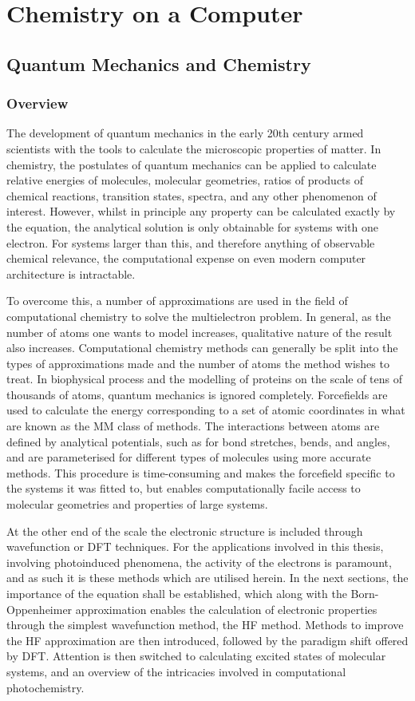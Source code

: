 \chapter{Chemistry on a Computer}
\label{chapter:theory}
\section{Quantum Mechanics and Chemistry}\label{section: QM}
\subsection{Overview}\label{section: QM_overview}
The development of quantum mechanics in the early 20th century armed scientists with the tools to calculate the microscopic properties of matter. In chemistry, the postulates of quantum mechanics can be applied to calculate relative energies of molecules, molecular geometries, ratios of products of chemical reactions, transition states, spectra, and any other phenomenon of interest. However, whilst in principle any property can be calculated exactly by the \schro{} equation, the analytical solution is only obtainable for systems with one electron. For systems larger than this, and therefore anything of observable chemical relevance, the computational expense on even modern computer architecture is intractable. 

To overcome this, a number of approximations are used in the field of computational chemistry to solve the multielectron problem. In general, as the number of atoms one wants to model increases, qualitative nature of the result also increases. Computational chemistry methods can generally be split into the types of approximations made and the number of atoms the method wishes to treat. In biophysical process and the modelling of proteins on the scale of tens of thousands of atoms, quantum mechanics is ignored completely. Forcefields are used to calculate the energy corresponding to a set of atomic coordinates in what are known as the \ac{MM} class of methods. The interactions between atoms are defined by analytical potentials, such as for bond stretches, bends, and angles, and are parameterised for different types of molecules using more accurate methods. This procedure is time-consuming and makes the forcefield specific to the systems it was fitted to, but enables computationally facile access to molecular geometries and properties of large systems.

At the other end of the scale the electronic structure is included through wavefunction or \ac{DFT} techniques. For the applications involved in this thesis, involving photoinduced phenomena, the activity of the electrons is paramount, and as such it is these methods which are utilised herein. In the next sections, the importance of the \schro{} equation shall be established, which along with the Born-Oppenheimer approximation enables the calculation of electronic properties through the simplest wavefunction method, the \ac{HF} method. Methods to improve the \ac{HF} approximation are then introduced, followed by the paradigm shift offered by \ac{DFT}. Attention is then switched to calculating excited states of molecular systems, and an overview of the intricacies involved in computational photochemistry.
